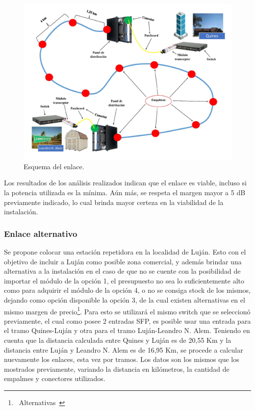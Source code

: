 \documentclass[11pt,a4paper]{article}
\begin{document}
\begin{figure}[htbp]
  \centering
  \includegraphics[width=0.7\linewidth]{fotos_ema/esq_enl_directo.jpg}
  \caption{Esquema del enlace.}
  \label{fig:esq_enl_directo}
\end{figure}


Los resultados de los análisis realizados indican que el enlace es viable, incluso si la potencia utilizada es la mínima. 
Aún más, se respeta el margen mayor a 5 dB previamente indicado, lo cual brinda mayor certeza en la viabilidad de la instalación.

 \subsubsection{Enlace alternativo}

Se propone colocar una estación repetidora en la localidad de Luján. 
Esto con el objetivo de incluir a Luján como posible zona comercial, y además brindar una alternativa a la instalación en el caso de que no se cuente con la posibilidad de importar el módulo de la opción 1, el presupuesto no sea lo suficientemente alto como para adquirir el módulo de la opción 4, o no se consiga stock de los mismos, dejando como opción disponible la opción 3, de la cual existen alternativas en el mismo margen de precio\footnote{\ $  $Alternativas\ }. 
Para esto se utilizará el mismo switch que se seleccionó previamente, el cual como posee 2 entradas SFP, es posible usar una entrada para el tramo Quines-Luján y otra para el tramo Luján-Leandro N. Alem. 
Teniendo en cuenta que la distancia calculada entre Quines y Luján es de 20,55 Km y la distancia entre Luján y Leandro N. Alem es de 16,95 Km, se procede a calcular nuevamente los enlaces, esta vez por tramos. 
Los datos son los mismos que los mostrados previamente, variando la distancia en kilómetros, la cantidad de empalmes y conectores utilizados. 
\end{document}
